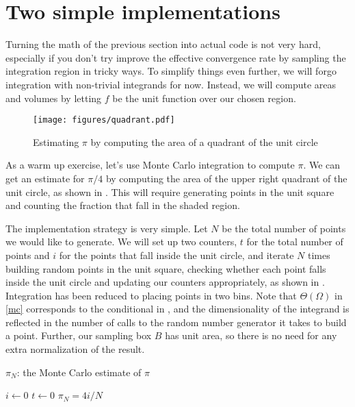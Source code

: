 %
%

\section{Two simple implementations}
\label{sec:simple}

Turning the math of the previous section into actual code is not very hard, especially if
you don't try improve the effective convergence rate by sampling the integration region in
tricky ways. To simplify things even further, we will forgo integration with non-trivial
integrands for now. Instead, we will compute areas and volumes by letting $f$ be the unit
function over our chosen region.
%
\begin{figure}
\centering
\texttt{[image: figures/quadrant.pdf]}
\caption{Estimating $\pi$ by computing the area of a quadrant of the unit circle
  \label{fig:pie}}
\end{figure}
%

As a warm up exercise, let's use Monte Carlo integration to compute $\pi$. We can get an
estimate for $\pi/4$ by computing the area of the upper right quadrant of the unit circle,
as shown in . This will require generating points in the unit square and
counting the fraction that fall in the shaded region.

The implementation strategy is very simple. Let $N$ be the total number of points we would like
to generate. We will set up two counters, $t$ for the total number of points and $i$ for the
points that fall inside the unit circle, and iterate $N$ times building random points in the
unit square, checking whether each point falls inside the unit circle and updating our counters
appropriately, as shown in .  Integration has been reduced to placing points in two
bins. Note that $\Theta(\Omega)$ in \eqref{mc} corresponds to the conditional in
, and the dimensionality of the integrand is reflected in the number of
calls to the random number generator it takes to build a point. Further, our sampling box $B$
has unit area, so there is no need for any extra normalization of the result.
%
\begin{algorithm}
\caption{$\pi_{N}$: the Monte Carlo estimate of $\pi$ \label{alg:pi}}
%
\DontPrintSemicolon
\SetAlgoNoEnd
%
$i \leftarrow 0$ \;
$t \leftarrow 0$ \;
$\pi_{N} = 4 i/N \;$ %
\end{algorithm}
%

